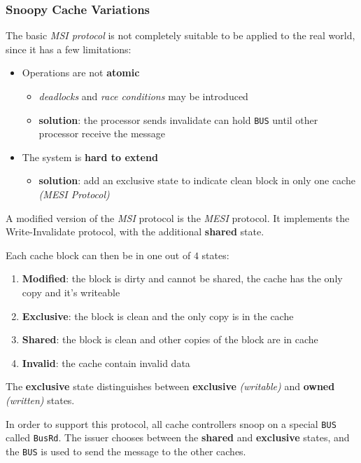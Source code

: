\documentclass[english]{article}
\begin{document}
\subsubsection{Snoopy Cache Variations}

The basic \textit{MSI protocol} is not completely suitable to be applied to the real world, since it has a few limitations:

\begin{itemize}
  \item Operations are not \textbf{atomic}
        \begin{itemize}
          \item \textit{deadlocks} and \textit{race conditions} may be introduced
          \item \textbf{solution}: the processor sends invalidate can hold \texttt{BUS} until other processor receive the message
        \end{itemize}
  \item The system is \textbf{hard to extend}
        \begin{itemize}
          \item \textbf{solution}: add an exclusive state to indicate clean block in only one cache \textit{(MESI Protocol)}
        \end{itemize}
\end{itemize}

\bigskip
A modified version of the \textit{MSI} protocol is the \textit{MESI} protocol.
It implements the Write-Invalidate protocol, with the additional \textbf{shared} state.

Each cache block can then be in one out of \(4\) states:

\begin{enumerate}
  \item \textbf{Modified}: the block is dirty and cannot be shared, the cache has the only copy and it's writeable
  \item \textbf{Exclusive}: the block is clean and the only copy is in the cache
  \item \textbf{Shared}: the block is clean and other copies of the block are in cache
  \item \textbf{Invalid}: the cache contain invalid data
\end{enumerate}

The \textbf{exclusive} state distinguishes between \textbf{exclusive} \textit{(writable)} and \textbf{owned} \textit{(written)} states.

In order to support this protocol, all cache controllers snoop on a special \texttt{BUS} called \texttt{BusRd}.
The issuer chooses between the \textbf{shared} and \textbf{exclusive} states, and the \texttt{BUS} is used to send the message to the other caches.
\end{document}
